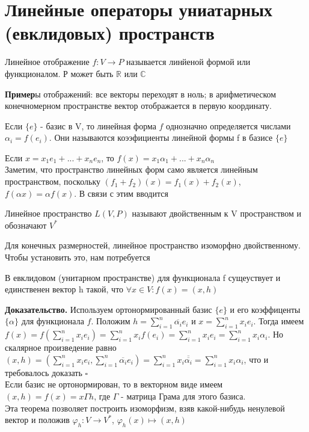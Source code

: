 \section{Линейные операторы униатарных (евклидовых) пространств}
\begin{defin}
Линейное отображение $f\colon V\to P$ называется линйеной формой или 
функционалом. Р может быть $\mathbb R$ или $\mathbb C$
\end{defin}
\textbf{Пример}ы отображений: все векторы переходят в ноль; в арифметическом
конечномерном пространстве вектор отображается в первую координату.\\
\begin{defin}Если $\{e\}$ - базис в V, то линейная форма $f$ однозначно 
определяется числами $\alpha_i=f(e_i)$. Они называются коээфициенты линейной
формы f в базисе $\{e\}$\end{defin} 
Если $x=x_1e_1+...+x_ne_n$, то $f(x)=x_1\alpha_1+...+x_n\alpha_n$\\
Заметим, что пространство линейных форм само является линейным пространством, 
поскольку $(f_1+f_2)(x)=f_1(x)+f_2(x)$, $f(\alpha x)=\alpha f(x)$. В связи
с этим вводится
\begin{defin}
Линейное пространство $L(V,P)$ называют двойственным к V пространством и
обозначают $V^*$
\end{defin}
Для конечных размерностей, линейное пространство изоморфно двойственному. 
Чтобы установить это, нам потребуется 
\begin{theor}
В евклидовом (унитарном пространстве) для функционала f сущеуствует и 
единственен вектор h такой, что $\forall x\in V\colon f(x)=(x,h)$
\end{theor}
\textbf{Доказательство.} Используем ортонормированный базис $\{e\}$ и его 
коэффиценты $\{\alpha\}$ для функционала $f$. Положим $h=\sum\limits^{n}_{i=1}
\overline{\alpha_i}e_i$ и $x=\sum\limits^{n}_{i=1}x_ie_i$.
Тогда имеем $f(x)=f(\sum\limits^{n}_{i=1}x_ie_i)=\sum\limits^{n}_{i=1}x_if(e_i)
=\sum\limits^{n}_{i=1}x_ie_i=\sum\limits^{n}_{i=1}x_i\alpha_i$. Но скалярное 
произведение равно
$(x,h)=(\sum\limits^{n}_{i=1}x_ie_i,\sum\limits^{n}_{i=1}\overline{\alpha_i}e_i)
=\sum\limits^{n}_{i=1}x_i\overline{\overline{\alpha_i}}=\sum\limits^{n}_{i=1}
x_i\alpha_i$, 
что и требовалось доказать $\square$\\
Если базис не ортонормирован, то в векторном виде имеем $(x,h)=f(x)=x\Gamma h$,
где $\Gamma$ - матрица Грама для этого базиса.\\
Эта теорема позволяет построить изоморфизм, взяв какой-нибудь ненулевой вектор
и положив $\varphi_h\colon V\to V^*$, $\varphi_h(x)\mapsto(x,h)$
